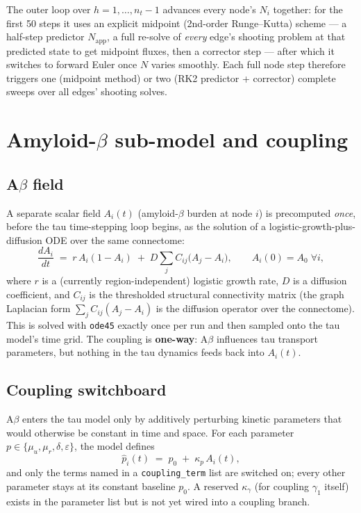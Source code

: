 ﻿\documentclass[11pt]{article}
\newcommand{\mur}{\mu_{r}}
\newcommand{\muu}{\mu_{u}}
\begin{document}
The outer loop over $h=1,\dots,n_t-1$ advances every node's $N_i$ together:
for the first 50 steps it uses an explicit midpoint (2nd-order Runge--Kutta)
scheme --- a half-step predictor $N_{\mathrm{app}}$, a full re-solve of
\emph{every} edge's shooting problem at that predicted state to get
midpoint fluxes, then a corrector step --- after which it switches to
forward Euler once $N$ varies smoothly. Each full node step therefore
triggers one (midpoint method) or two (RK2 predictor + corrector) complete
sweeps over all edges' shooting solves.

\section{Amyloid-$\beta$ sub-model and coupling}
\label{sec:abeta}

\subsection{A$\beta$ field}

A separate scalar field $A_i(t)$ (amyloid-$\beta$ burden at node $i$) is
precomputed \emph{once}, before the tau time-stepping loop begins, as the
solution of a logistic-growth-plus-diffusion ODE over the same connectome:
\[
  \frac{dA_i}{dt} \;=\; r\,A_i(1-A_i) \;+\; D\sum_j C_{ij}\big(A_j - A_i\big),
  \qquad A_i(0) = A_0 \; \forall i,
\]
where $r$ is a (currently region-independent) logistic growth rate, $D$ is a
diffusion coefficient, and $C_{ij}$ is the thresholded structural
connectivity matrix (the graph Laplacian form $\sum_j C_{ij}(A_j-A_i)$ is the
diffusion operator over the connectome). This is solved with \texttt{ode45}
exactly once per run and then sampled onto the tau model's time grid. The
coupling is \textbf{one-way}: A$\beta$ influences tau transport parameters,
but nothing in the tau dynamics feeds back into $A_i(t)$.

\subsection{Coupling switchboard}

A$\beta$ enters the tau model only by additively perturbing kinetic
parameters that would otherwise be constant in time and space. For each
parameter $p \in \{\muu, \mur, \delta, \varepsilon\}$, the model defines
\[
  \hat{p}_i(t) \;=\; p_0 \;+\; \kappa_p\, A_i(t),
\]
and only the terms named in a \texttt{coupling\_term} list are switched on;
every other parameter stays at its constant baseline $p_0$. A reserved
$\kappa_\gamma$ (for coupling $\gamma_1$ itself) exists in the parameter
list but is not yet wired into a coupling branch.
\end{document}
